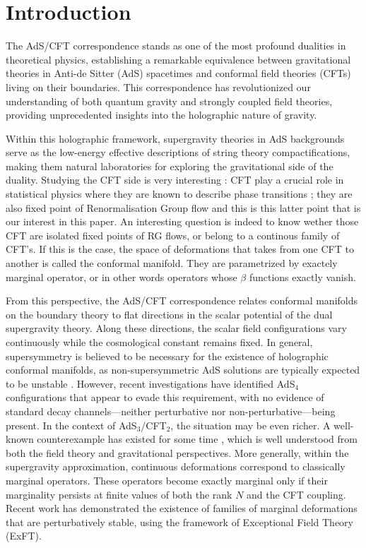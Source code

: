 \documentclass[11pt,a4paper]{article}
\begin{document}
\section{Introduction}

The AdS/CFT correspondence \cite{Maldacena:1997re} stands as one of the most profound dualities in theoretical physics, establishing a remarkable equivalence between gravitational theories in Anti-de Sitter (AdS) spacetimes and conformal field theories (CFTs) living on their boundaries. This correspondence has revolutionized our understanding of both quantum gravity and strongly coupled field theories, providing unprecedented insights into the holographic nature of gravity. 

Within this holographic framework, supergravity theories in AdS backgrounds serve as the low-energy effective descriptions of string theory compactifications, making them natural laboratories for exploring the gravitational side of the duality. Studying the CFT side is very interesting : CFT play a crucial role in statistical physics where they are known to describe phase transitions ; they are also fixed point of Renormalisation Group flow and this is this latter point that is our interest in this paper. An interesting question is indeed to know wether those CFT are isolated fixed points of RG flows, or belong to a continous family of CFT's. If this is the case, the space of deformations that takes from one CFT to another is called the conformal manifold. They are parametrized by exactely marginal operator, or in other words operators whose $\beta$ functions exactly vanish. 

From this perspective, the AdS/CFT correspondence relates conformal manifolds on the boundary theory to flat directions in the scalar potential of the dual supergravity theory. Along these directions, the scalar field configurations vary continuously while the cosmological constant remains fixed. In general, supersymmetry is believed to be necessary for the existence of holographic conformal manifolds, as non-supersymmetric AdS solutions are typically expected to be unstable \cite{Ooguri:2016pdq,Palti:2019pca}. However, recent investigations \cite{Giambrone:2021wsm} have identified AdS$_4$ configurations that appear to evade this requirement, with no evidence of standard decay channels—neither perturbative nor non-perturbative—being present. In the context of AdS$_3$/CFT$_2$, the situation may be even richer. A well-known counterexample has existed for some time \cite{Aharony:2001dp,Dong:2014tsa}, which is well understood from both the field theory and gravitational perspectives. More generally, within the supergravity approximation, continuous deformations correspond to classically marginal operators. These operators become exactly marginal only if their marginality persists at finite values of both the rank $N$ and the CFT coupling. Recent work \cite{Eloy:2024lwn} has demonstrated the existence of families of marginal deformations that are perturbatively stable, using the framework of Exceptional Field Theory (ExFT).
\end{document}
